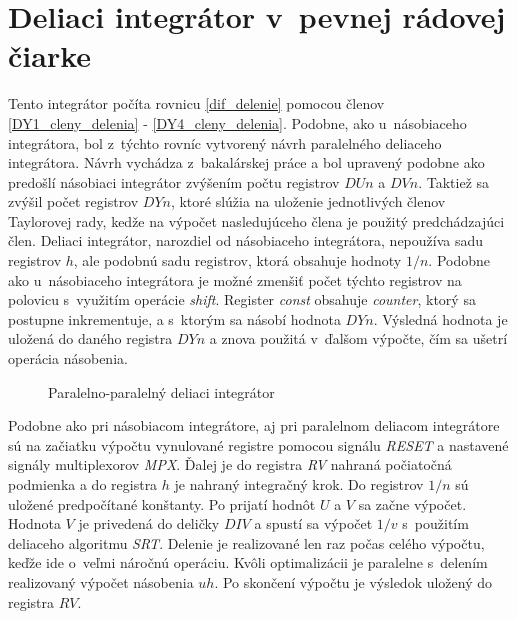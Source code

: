 \section{Deliaci integrátor v~pevnej rádovej čiarke}
Tento integrátor počíta rovnicu \eqref{dif_delenie} pomocou členov \eqref{DY1_cleny_delenia} - \eqref{DY4_cleny_delenia}. Podobne, ako u~násobiaceho integrátora, bol z~týchto rovníc vytvorený návrh paralelného deliaceho integrátora. Návrh vychádza z~bakalárskej práce \cite{MatecnyBP} a bol upravený podobne ako predošlí násobiaci integrátor zvýšením počtu registrov $ DUn $ a $ DVn $. Taktiež sa zvýšil počet registrov $ DYn $, ktoré slúžia na uloženie jednotlivých členov Taylorovej rady, kedže na výpočet nasledujúceho člena je použitý predchádzajúci člen. Deliaci integrátor, narozdiel od násobiaceho integrátora, nepoužíva sadu registrov $ h $, ale podobnú sadu registrov, ktorá obsahuje hodnoty $ 1/n $. Podobne ako u~násobiaceho integrátora je možné zmenšiť počet týchto registrov na polovicu s~využitím operácie \textit{shift}. Register \textit{const} obsahuje \textit{counter}, ktorý sa postupne inkrementuje, a s~ktorým sa násobí hodnota $ DYn $. Výsledná hodnota je uložená do daného registra $ DYn $ a znova použitá v~ďalšom výpočte, čím sa ušetrí operácia násobenia.

\begin{figure}[h]
\centering
{}
\caption{Paralelno-paralelný deliaci integrátor \cite{MatecnyBP}}
\label{ppdi}
\end{figure}
\bigskip

Podobne ako pri násobiacom integrátore, aj pri paralelnom deliacom integrátore sú na začiatku výpočtu vynulované registre pomocou signálu \textit{RESET} a nastavené signály multiplexorov \textit{MPX}. Ďalej je do registra \textit{RV} nahraná počiatočná podmienka a do registra $ h $ je nahraný integračný krok. Do registrov $ 1/n $ sú uložené predpočítané konštanty. Po prijatí hodnôt $ U $ a $ V $ sa začne výpočet. Hodnota $ V $ je privedená do deličky $ DIV $ a spustí sa výpočet $ 1/v $ s~použitím deliaceho algoritmu \textit{SRT}. Delenie je realizované len raz počas celého výpočtu, keďže ide o~veľmi náročnú operáciu. Kvôli optimalizácii je paralelne s~delením realizovaný výpočet násobenia $ uh $.
Po skončení výpočtu je výsledok uložený do registra $ RV $. 

